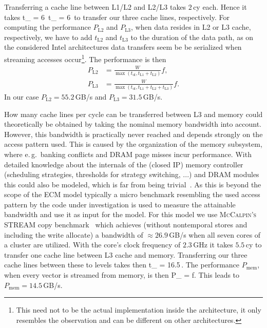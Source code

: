Transferring a cache line between L1/L2 and L2/L3 takes $2$\,cy each.
Hence it takes
%
\be
  t_ = 6\, \qquad {} \qquad t_ = 6\,
\ee
%
to transfer our three cache lines, respectively.
For computing the performance $P_\text{L2}$ and $P_\text{L3}$, when data resides
in L2 or L3 cache, respectively, we have to add $t_\text{L2}$ and $t_\text{L3}$
to the duration of the data path, as on the considered Intel architectures data
transfers seem be be serialized when streaming accesses occur\footnote{This need
not to be the actual implementation inside the architecture, it only resembles
the observation and can be different on other architectures.}.
The performance is then
%
\begin{align}
  P_\text{L2} &= \frac{W}{\max(t_\text{ol}, t_\text{L1} + t_\text{L2})} f, \\
  P_\text{L3} &= \frac{W}{\max(t_\text{ol}, t_\text{L1} + t_\text{L2} +
t_\text{L3})} f.
\end{align}
%
In our case $P_\text{L2} = 55.2$\,GB/s and $P_\text{L3} = 31.5$\,GB/s.
%

How many cache lines per cycle can be transferred between L3 and memory could
theoretically be obtained by taking the nominal memory bandwidth into account.
However, this bandwidth is practically never reached and depends strongly on the
access pattern used.
This is caused by the organization of the memory subsystem, where e.\,g.\ banking
conflicts and DRAM page misses incur performance.
With detailed knowledge about the internals of the (closed IP) memory controller
(scheduling strategies, thresholds for strategy switching, ...) and DRAM modules
this could also be modeled, which is far from being trivial~\cite{jacob-2007}.
As this is beyond the scope of the ECM model typically a micro benchmark
resembling the used access pattern by the code under investigation is used
to measure the attainable bandwidth and use it as input for the model.
%
For this model we use \textsc{McCalpin's} STREAM copy
benchmark~\cite{mccalpin-1995} which achieves (without nontemporal stores and
including the write allocate) a bandwidth of $\approx 26.9$\,GB/s when all seven cores
of a cluster are utilized.
With the core's clock frequency of $2.3$\,GHz it takes $5.5$\,cy to transfer one
cache line between L3 cache and memory.
Transferring our three cache lines between these to levels takes then
%
\be
  t_ = 16.5\,.
\ee
%
The performance $P_\text{mem}$, when every vector is streamed from memory, is then
%
\be
  P_ =  f.
\ee
%
This leads to $P_\text{mem} = 14.5$\,GB/s. 

